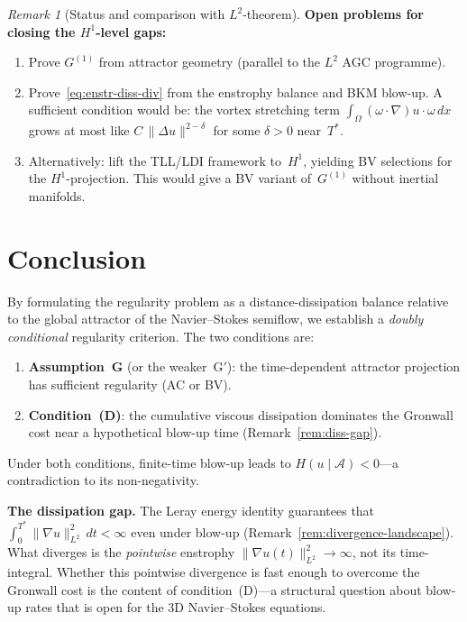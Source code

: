 \documentclass[12pt,a4paper]{article}
\theoremstyle{definition}
\theoremstyle{plain}
\theoremstyle{remark}
\newtheorem{remark}[definition]{Remark}
\begin{document}
\begin{remark}[Status and comparison with $L^2$-theorem]
\medskip\noindent
\textbf{Open problems for closing the $H^1$-level gaps:}
\begin{enumerate}
  \item Prove $G^{(1)}$ from attractor geometry (parallel to the
    $L^2$ AGC programme).
  \item Prove~\eqref{eq:enstr-diss-div} from the enstrophy balance
    and BKM blow-up.  A sufficient condition would be: the vortex
    stretching term $\int_\Omega(\omega\cdot\nabla)u\cdot\omega\,dx$
    grows at most like $C\,\|\Delta u\|^{2-\delta}$ for some
    $\delta > 0$ near~$T^*$.
  \item Alternatively: lift the TLL/LDI framework to~$H^1$,
    yielding BV selections for the $H^1$-projection.  This would
    give a BV variant of~$G^{(1)}$ without inertial manifolds.
\end{enumerate}
\end{remark}


\section{Conclusion}
By formulating the regularity problem as a distance-dissipation balance
relative to the global attractor of the Navier--Stokes semiflow, we
establish a \emph{doubly conditional} regularity criterion.  The two
conditions are:
\begin{enumerate}
  \item \textbf{Assumption~G} (or the weaker~G$'$): the time-dependent
    attractor projection has sufficient regularity (AC or BV).
  \item \textbf{Condition~(D)}: the cumulative viscous dissipation
    dominates the Gronwall cost near a hypothetical blow-up time
    (Remark~\ref{rem:diss-gap}).
\end{enumerate}
Under both conditions, finite-time blow-up leads to
$H(u \mid \mathcal{A}) < 0$---a contradiction to its non-negativity.

\medskip\noindent
\textbf{The dissipation gap.}\;
The Leray energy identity guarantees that
$\int_0^{T^*}\|\nabla u\|_{L^2}^2\,dt < \infty$ even under blow-up
(Remark~\ref{rem:divergence-landscape}).  What diverges is the
\emph{pointwise} enstrophy $\|\nabla u(t)\|_{L^2}^2 \to \infty$,
not its time-integral.  Whether this pointwise divergence is fast
enough to overcome the Gronwall cost is the content of
condition~(D)---a structural question about blow-up rates that is
open for the 3D Navier--Stokes equations.
\end{document}
